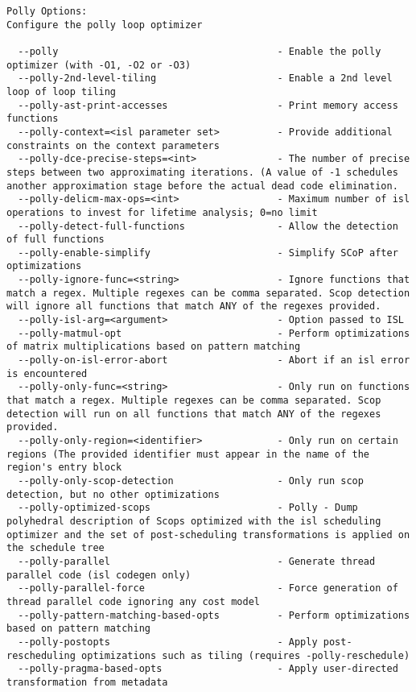 \documentclass[732]{studrep}
\begin{document}
\begin{verbatim}
Polly Options:
Configure the polly loop optimizer

  --polly                                      - Enable the polly optimizer (with -O1, -O2 or -O3)
  --polly-2nd-level-tiling                     - Enable a 2nd level loop of loop tiling
  --polly-ast-print-accesses                   - Print memory access functions
  --polly-context=<isl parameter set>          - Provide additional constraints on the context parameters
  --polly-dce-precise-steps=<int>              - The number of precise steps between two approximating iterations. (A value of -1 schedules another approximation stage before the actual dead code elimination.
  --polly-delicm-max-ops=<int>                 - Maximum number of isl operations to invest for lifetime analysis; 0=no limit
  --polly-detect-full-functions                - Allow the detection of full functions
  --polly-enable-simplify                      - Simplify SCoP after optimizations
  --polly-ignore-func=<string>                 - Ignore functions that match a regex. Multiple regexes can be comma separated. Scop detection will ignore all functions that match ANY of the regexes provided.
  --polly-isl-arg=<argument>                   - Option passed to ISL
  --polly-matmul-opt                           - Perform optimizations of matrix multiplications based on pattern matching
  --polly-on-isl-error-abort                   - Abort if an isl error is encountered
  --polly-only-func=<string>                   - Only run on functions that match a regex. Multiple regexes can be comma separated. Scop detection will run on all functions that match ANY of the regexes provided.
  --polly-only-region=<identifier>             - Only run on certain regions (The provided identifier must appear in the name of the region's entry block
  --polly-only-scop-detection                  - Only run scop detection, but no other optimizations
  --polly-optimized-scops                      - Polly - Dump polyhedral description of Scops optimized with the isl scheduling optimizer and the set of post-scheduling transformations is applied on the schedule tree
  --polly-parallel                             - Generate thread parallel code (isl codegen only)
  --polly-parallel-force                       - Force generation of thread parallel code ignoring any cost model
  --polly-pattern-matching-based-opts          - Perform optimizations based on pattern matching
  --polly-postopts                             - Apply post-rescheduling optimizations such as tiling (requires -polly-reschedule)
  --polly-pragma-based-opts                    - Apply user-directed transformation from metadata

\end{verbatim}
\end{document}
